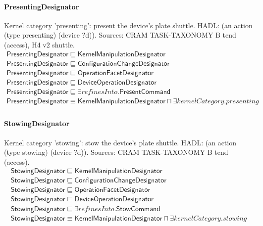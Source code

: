 \documentclass[10pt]{article}
\begin{document}
\paragraph{PresentingDesignator} Kernel category 'presenting': present the device's plate shuttle. HADL: (an action (type presenting) (device ?d)). Sources: CRAM TASK-TAXONOMY B tend (access), H4 v2 shuttle.
\[\begin{array}{l}
\mathsf{PresentingDesignator} \sqsubseteq  \mathsf{KernelManipulationDesignator} \\
\mathsf{PresentingDesignator} \sqsubseteq  \mathsf{ConfigurationChangeDesignator} \\
\mathsf{PresentingDesignator} \sqsubseteq  \mathsf{OperationFacetDesignator} \\
\mathsf{PresentingDesignator} \sqsubseteq  \mathsf{DeviceOperationDesignator} \\
\mathsf{PresentingDesignator} \sqsubseteq  \exists \mathit{refinesInto}.\mathsf{PresentCommand} \\
\mathsf{PresentingDesignator} \equiv  \mathsf{KernelManipulationDesignator} \sqcap  \exists \mathit{kernelCategory}.{presenting} \\
\end{array}\]
\paragraph{StowingDesignator} Kernel category 'stowing': stow the device's plate shuttle. HADL: (an action (type stowing) (device ?d)). Sources: CRAM TASK-TAXONOMY B tend (access).
\[\begin{array}{l}
\mathsf{StowingDesignator} \sqsubseteq  \mathsf{KernelManipulationDesignator} \\
\mathsf{StowingDesignator} \sqsubseteq  \mathsf{ConfigurationChangeDesignator} \\
\mathsf{StowingDesignator} \sqsubseteq  \mathsf{OperationFacetDesignator} \\
\mathsf{StowingDesignator} \sqsubseteq  \mathsf{DeviceOperationDesignator} \\
\mathsf{StowingDesignator} \sqsubseteq  \exists \mathit{refinesInto}.\mathsf{StowCommand} \\
\mathsf{StowingDesignator} \equiv  \mathsf{KernelManipulationDesignator} \sqcap  \exists \mathit{kernelCategory}.{stowing} \\
\end{array}\]
\end{document}
